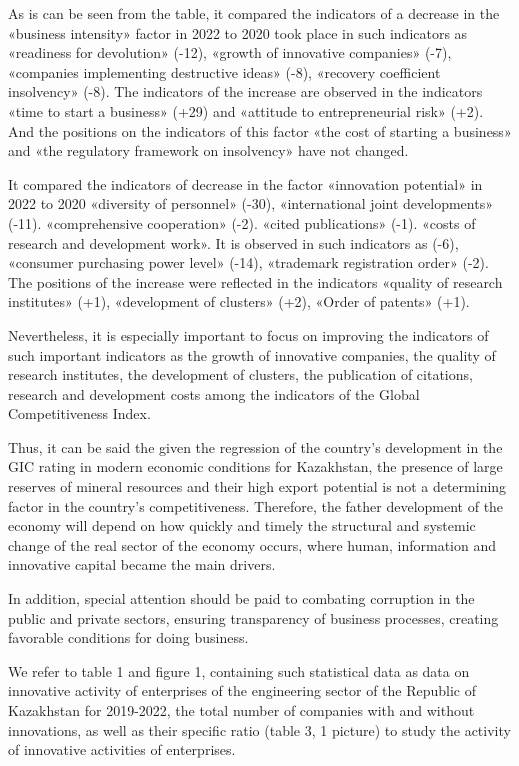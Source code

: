 \begin{multicols}{2}
As is can be seen from the table, it compared the indicators of a
decrease in the «business intensity» factor in 2022 to 2020 took place
in such indicators as «readiness for devolution» (-12), «growth of
innovative companies» (-7), «companies implementing destructive ideas»
(-8), «recovery coefficient insolvency» (-8). The indicators of the
increase are observed in the indicators «time to start a business» (+29)
and «attitude to entrepreneurial risk» (+2). And the positions on the
indicators of this factor «the cost of starting a business» and «the
regulatory framework on insolvency» have not changed.

It compared the indicators of decrease in the factor «innovation
potential» in 2022 to 2020 «diversity of personnel» (-30),
«international joint developments» (-11). «comprehensive cooperation»
(-2). «cited publications» (-1). «costs of research and development
work». It is observed in such indicators as (-6), «consumer purchasing
power level» (-14), «trademark registration order» (-2). The positions
of the increase were reflected in the indicators «quality of research
institutes» (+1), «development of clusters» (+2), «Order of patents»
(+1).

Nevertheless, it is especially important to focus on improving the
indicators of such important indicators as the growth of innovative
companies, the quality of research institutes, the development of
clusters, the publication of citations, research and development costs
among the indicators of the Global Competitiveness Index.

Thus, it can be said the given the regression of the country's
development in the GIC rating in modern economic conditions for
Kazakhstan, the presence of large reserves of mineral resources and
their high export potential is not a determining factor in the country's
competitiveness. Therefore, the father development of the economy will
depend on how quickly and timely the structural and systemic change of
the real sector of the economy occurs, where human, information and
innovative capital became the main drivers.

In addition, special attention should be paid to combating corruption in
the public and private sectors, ensuring transparency of business
processes, creating favorable conditions for doing business.

We refer to table 1 and figure 1, containing such statistical data as
data on innovative activity of enterprises of the engineering sector of
the Republic of Kazakhstan for 2019-2022, the total number of companies
with and without innovations, as well as their specific ratio (table 3,
1 picture) to study the activity of innovative activities of
enterprises.
\end{multicols}

